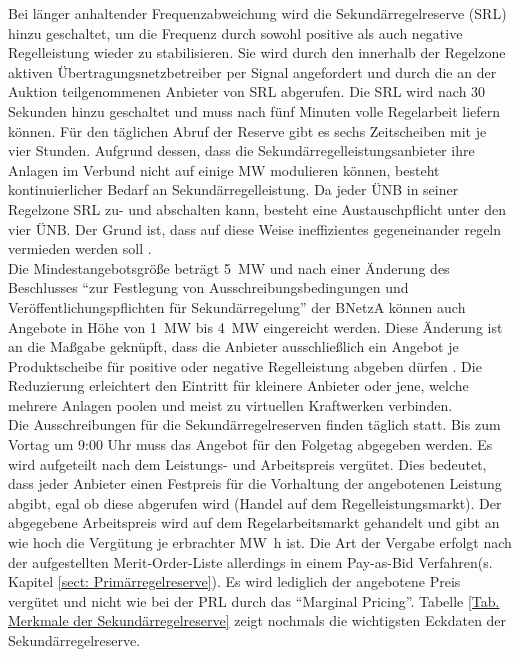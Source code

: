 			Bei länger anhaltender Frequenzabweichung wird die Sekundärregelreserve (SRL) hinzu geschaltet, um die Frequenz durch sowohl positive als auch negative Regelleistung wieder zu stabilisieren.
			Sie wird durch den innerhalb der Regelzone aktiven Übertragungsnetzbetreiber per Signal angefordert und durch die an der Auktion teilgenommenen Anbieter von SRL abgerufen. 
			Die SRL wird nach \num{30} Sekunden hinzu geschaltet und muss nach fünf Minuten volle Regelarbeit liefern können. 
			Für den täglichen Abruf der Reserve gibt es sechs Zeitscheiben mit je vier Stunden.
			Aufgrund dessen, dass die Sekundärregelleistungsanbieter ihre Anlagen im Verbund nicht auf einige \si{\mega\watt} modulieren können, besteht kontinuierlicher Bedarf an Sekundärregelleistung.
			Da jeder ÜNB in seiner Regelzone SRL zu- und abschalten kann, besteht eine Austauschpflicht unter den vier ÜNB.
			Der Grund ist, dass auf diese Weise ineffizientes gegeneinander regeln vermieden werden soll \parencite{SRL_NextKraftwerke}. \\
			
			Die Mindestangebotsgröße beträgt \SI{5}{\mega\watt} und nach einer Änderung des Beschlusses "`zur Festlegung von Ausschreibungsbedingungen und Veröffentlichungspflichten für Sekundärregelung"' der BNetzA können auch Angebote in Höhe von \SI{1}{\mega\watt} bis \SI{4}{\mega\watt} eingereicht werden.
			Diese Änderung ist an die Maßgabe geknüpft, dass die Anbieter ausschließlich ein Angebot je Produktscheibe für positive oder negative Regelleistung abgeben dürfen \parencite{Beschluss_SRL}.
			Die Reduzierung erleichtert den Eintritt für kleinere Anbieter oder jene, welche mehrere Anlagen poolen und meist zu virtuellen Kraftwerken verbinden. \\
			
			Die Ausschreibungen für die Sekundärregelreserven finden täglich statt. 
			Bis zum Vortag um 9:00 Uhr muss das Angebot für den Folgetag abgegeben werden.
			Es wird aufgeteilt nach dem Leistungs- und Arbeitspreis vergütet.
			Dies bedeutet, dass jeder Anbieter einen Festpreis für die Vorhaltung der angebotenen Leistung abgibt, egal ob diese abgerufen wird (Handel auf dem Regelleistungsmarkt).
			Der abgegebene Arbeitspreis wird auf dem Regelarbeitsmarkt gehandelt und gibt an wie hoch die Vergütung je erbrachter \si{\mega\watt\hour} ist.
			Die Art der Vergabe erfolgt nach der aufgestellten Merit-Order-Liste allerdings in einem Pay-as-Bid Verfahren(s. Kapitel \ref{sect: Primärregelreserve}).
			Es wird lediglich der angebotene Preis vergütet und nicht wie bei der PRL durch das "`Marginal Pricing"'.
			Tabelle \ref{Tab. Merkmale der Sekundärregelreserve} zeigt nochmals die wichtigsten Eckdaten der Sekundärregelreserve.
			
